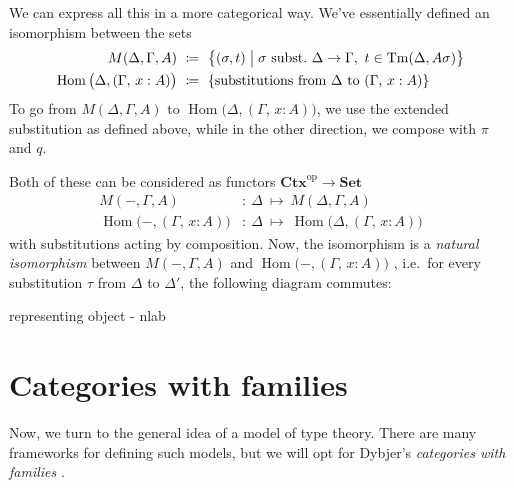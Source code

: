 \documentclass{article}
\theoremstyle{definition}
\newcommand{\comp}[2]{#2#1}%
\newcommand{\substType}[2]{#2#1}%
\newcommand{\extsub}[2]{\ang{#1,#2}}
\newcommand{\C}{\mathbf{Ctx}}
\newcommand{\Set}{\mathbf{Set}}
\newcommand{\Tm}{\mathrm{Tm}}
\newcommand{\op}[1]{{#1}^\mathrm{op}}           %
\DeclareMathOperator{\Hom}{Hom}
\newcommand{\defeq}{
	\mathrel{\mathrel{\mathop:}\mkern-1.2mu=}}	%
\newcommand{\ang}[1]{\left\langle #1 \right\rangle}
\newcommand{\pair}[2]{(#1,#2)}
\begin{document}
We can express all this in a more categorical way. We've essentially defined an isomorphism between the sets
\begin{align*}
    M(\Delta,\Gamma,A)\ &\defeq\ \big\{ \pair{\sigma}{t} \mathrel{\big|} \sigma \text{ subst.}\ \Delta \to \Gamma,\ t \in \Tm(\Delta, \substType{\sigma}{A}) \big\} \\
    \Hom \big( \Delta, (\Gamma,\, x : A) \big)\ &\defeq\ \{ \text{substitutions from } \Delta \text{ to } (\Gamma,\, x : A) \}
\end{align*}
To go from $M(\Delta,\Gamma,A)$ to $\Hom \big( \Delta, (\Gamma,\, x : A) \big)$, we use the extended substitution as defined above, while in the other direction, we compose with $\pi$ and $q$.

Both of these can be considered as functors $\op{\C} \to \Set$
\begin{align*}
    M(-,\Gamma,A)&\colon\ \Delta\ \mapsto\ M(\Delta,\Gamma,A) \\
    \Hom \big( -, (\Gamma,\, x : A) \big)&\colon\ \Delta\ \mapsto\ \Hom \big( \Delta, (\Gamma,\, x : A) \big)
\end{align*}
with substitutions acting by composition. Now, the isomorphism is a \textit{natural isomorphism} between $M(-,\Gamma,A)$ and $\Hom \big( -, (\Gamma,\, x : A) \big)$ \cite{gpoid}, i.e.\ for every substitution $\tau$ from $\Delta$ to $\Delta'$, the following diagram commutes:
\begin{center}
\end{center}


{\color{red}
representing object - nlab \cite{nlab-cwfs}}


\section{Categories with families}

Now, we turn to the general idea of a model of type theory. There are many frameworks for defining such models, but we will opt for Dybjer's \textit{categories with families} \cite{peter}.
\end{document}
